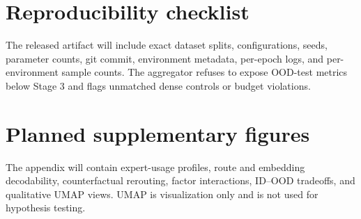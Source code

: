 \section{Reproducibility checklist}

The released artifact will include exact dataset splits, configurations, seeds, parameter counts,
git commit, environment metadata, per-epoch logs, and per-environment sample counts. The aggregator
refuses to expose OOD-test metrics below Stage 3 and flags unmatched dense controls or budget
violations.

\section{Planned supplementary figures}

The appendix will contain expert-usage profiles, route and embedding decodability, counterfactual
rerouting, factor interactions, ID--OOD tradeoffs, and qualitative UMAP views. UMAP is
visualization only and is not used for hypothesis testing.
